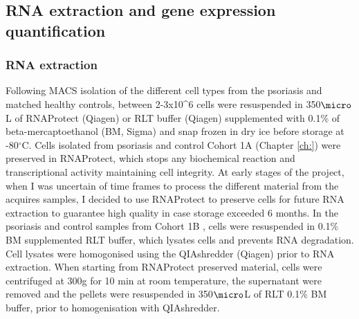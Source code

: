 

\subsection{RNA extraction and gene expression quantification}

\subsubsection{RNA extraction}
Following MACS isolation of the different cell types from the psoriasis and matched healthy controls, between 2-3x10^6 cells were resuspended in 350$\micro$L of RNAProtect (Qiagen) or RLT buffer (Qiagen) supplemented with 0.1\% of beta-mercaptoethanol (BM, Sigma) and snap frozen in dry ice before storage at -80{$^\circ$}C. Cells isolated from psoriasis and control Cohort 1A (Chapter \ref{ch:}) were preserved in RNAProtect, which stops any biochemical reaction and transcriptional activity maintaining cell integrity. At early stages of the project, when I was uncertain of time frames to process the different material from the acquires samples, I decided to use RNAProtect to preserve cells for future RNA extraction to guarantee high quality in case storage exceeded 6 months. In the psoriasis and control samples from Cohort 1B %
, cells were resuspended in 0.1\% BM supplemented RLT buffer, which lysates cells and prevents RNA degradation. Cell lysates were homogonised using the QIAshredder (Qiagen) prior to RNA extraction. When starting from RNAProtect preserved material, cells were centrifuged at 300g for 10 min at room temperature, the supernatant were removed and the pellets were resuspended in 350$\micro$L of RLT 0.1\% BM buffer, prior to homogenisation with QIAshredder.

